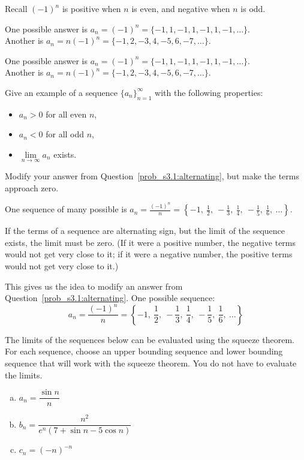\begin{hint}
Recall $(-1)^n$ is positive when $n$ is even, and negative when $n$ is odd.
\end{hint}
\begin{answer}
One possible answer is $a_n=(-1)^{n} = \{-1, 1,-1,1,-1,1,-1,\ldots\}$. \\Another is
$a_n=n(-1)^{n} = \{-1, 2,-3,4,-5,6,-7,\ldots\}$.
\end{answer}
\begin{solution}
One possible answer is $a_n=(-1)^{n} = \{-1, 1,-1,1,-1,1,-1,\ldots\}$. \\Another is
$a_n=n(-1)^{n} = \{-1, 2,-3,4,-5,6,-7,\ldots\}$.
\end{solution}
\begin{Mquestion}
Give an example of a sequence $\{a_n\}_{n=1}^{\infty}$ with the following properties:
\begin{itemize}
\item $a_n>0$ for all even $n$,
\item $a_n<0$ for all odd $n$,
\item $\lim\limits_{n \to \infty} a_n$ exists.
\end{itemize}
\end{Mquestion}
\begin{hint}
Modify your answer from Question~\ref{prob_s3.1:alternating}, but make the terms approach zero.
\end{hint}
\begin{answer}
One  sequence of many possible is
$\displaystyle a_n = \frac{(-1)^n}{n} = \left\{-1,\ \frac12,\ -\frac13,\ \frac14,\ -\frac15,\ \frac16,\ \ldots \right\}$.
\end{answer}
\begin{solution}
If the terms of a sequence are alternating sign, but the limit of the sequence exists, the limit must be zero. (If it were a positive number, the negative terms would not get very close to it; if it were a negative number, the positive terms would not get very close to it.)

This gives us the idea to modify an answer from Question~\ref{prob_s3.1:alternating}. One possible sequence:
\[a_n = \frac{(-1)^n}{n} = \left\{-1,\ \frac12,\ -\frac13,\ \frac14,\ -\frac15,\ \frac16,\ \ldots \right\}\]
\end{solution}
\begin{Mquestion}
The limits of the sequences below can be evaluated using the squeeze theorem. For each sequence, choose an upper bounding sequence and lower bounding sequence that will work with the squeeze theorem. You do not have to evaluate the limits.
\begin{enumerate}[(a)]
\item $a_n = \dfrac{\sin n}{n}$
\item $b_n = \dfrac{n^2}{e^n(7+\sin n - 5\cos n)}$
\item $c_n = (-n)^{-n}$
\end{enumerate}
\end{Mquestion}

